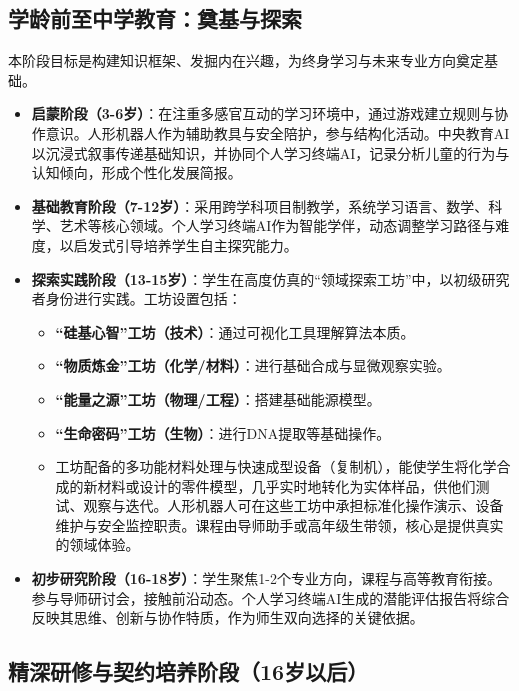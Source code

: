 \subsection{学龄前至中学教育：奠基与探索}\label{ux5b66ux9f84ux524dux81f3ux4e2dux5b66ux6559ux80b2ux5960ux57faux4e0eux63a2ux7d22}

本阶段目标是构建知识框架、发掘内在兴趣，为终身学习与未来专业方向奠定基础。

\begin{itemize}
\item
  \textbf{启蒙阶段（3-6岁）}：在注重多感官互动的学习环境中，通过游戏建立规则与协作意识。人形机器人作为辅助教具与安全陪护，参与结构化活动。中央教育AI以沉浸式叙事传递基础知识，并协同个人学习终端AI，记录分析儿童的行为与认知倾向，形成个性化发展简报。
\item
  \textbf{基础教育阶段（7-12岁）}：采用跨学科项目制教学，系统学习语言、数学、科学、艺术等核心领域。个人学习终端AI作为智能学伴，动态调整学习路径与难度，以启发式引导培养学生自主探究能力。
\item
  \textbf{探索实践阶段（13-15岁）}：学生在高度仿真的``领域探索工坊''中，以初级研究者身份进行实践。工坊设置包括：

  \begin{itemize}
  \tightlist
  \item
    \textbf{``硅基心智''工坊（技术）}：通过可视化工具理解算法本质。
  \item
    \textbf{``物质炼金''工坊（化学/材料）}：进行基础合成与显微观察实验。
  \item
    \textbf{``能量之源''工坊（物理/工程）}：搭建基础能源模型。
  \item
    \textbf{``生命密码''工坊（生物）}：进行DNA提取等基础操作。
  \item
    工坊配备的多功能材料处理与快速成型设备（复制机），能使学生将化学合成的新材料或设计的零件模型，几乎实时地转化为实体样品，供他们测试、观察与迭代。人形机器人可在这些工坊中承担标准化操作演示、设备维护与安全监控职责。课程由导师助手或高年级生带领，核心是提供真实的领域体验。
  \end{itemize}
\item
  \textbf{初步研究阶段（16-18岁）}：学生聚焦1-2个专业方向，课程与高等教育衔接。参与导师研讨会，接触前沿动态。个人学习终端AI生成的潜能评估报告将综合反映其思维、创新与协作特质，作为师生双向选择的关键依据。
\end{itemize}

\subsection{精深研修与契约培养阶段（16岁以后）}\label{ux7cbeux6df1ux7814ux4feeux4e0eux5951ux7ea6ux57f9ux517bux9636ux6bb516ux5c81ux4ee5ux540e}

